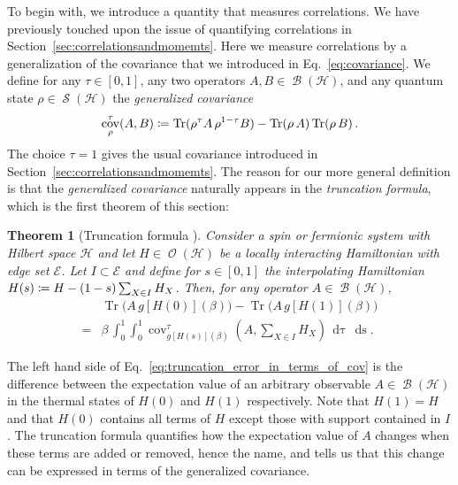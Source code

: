 \documentclass[a4paper,12pt,listof=totoc,index=totoc,bibliography=totoc,headsepline=false,headings=normal,BCOR16.153846mm,DIV12,headinclude,twoside,cleardoublepage=empty,numbers=noenddot,final]{scrreprt}
\theoremstyle{mystyle}
\numberwithin{equation}{section}
\numberwithin{figure}{section}
\numberwithin{lemma}{section}
\newtheorem{theorem}{Theorem}
\numberwithin{theorem}{section}
\numberwithin{corollary}{section}
\numberwithin{definition}{section}
\numberwithin{conjecture}{section}
\numberwithin{observation}{section}
\newcommand{\+}{\mkern2mu}
\newcommand{\coloneqq}{\mathrel{\vcentcolon\mkern-1.2mu=}} %
\newcommand{\texteqref}[1]{Eq.~\eqref{#1}}
\renewcommand{\H}{H}
\newcommand{\rhog}{g}
\newcommand{\Eset}{\mathcal{E}}
\newcommand{\dd}[1]{\mathop{\mathrm{d}#1}}
\DeclareMathOperator{\1}{\mathds{1}}
\DeclareMathOperator{\Bop}{\mathcal{B}}
\DeclareMathOperator{\Obs}{\mathcal{O}}
\DeclareMathOperator{\Qst}{\mathcal{S}}
\DeclareMathOperator{\Tr}{Tr}
\DeclareMathOperator{\cov}{cov}
\newcommand{\mc}[1]{\mathcal{#1}}
\newcommand{\mcH}{\mc{H}}
\begin{document}
To begin with, we introduce a quantity that measures correlations.
We have previously touched upon the issue of quantifying correlations in Section~\ref{sec:correlationsandmomemts}.
Here we measure correlations by a generalization of the covariance that we introduced in \texteqref{eq:covariance}.
We define for any $\tau \in [0,1]$, any two operators $A,B \in \Bop(\mcH)$, and any quantum state $\rho \in \Qst(\mcH)$ the \emph{generalized covariance}
\begin{equation} \label{eq:generalizedcovariance}
 \cov_\rho^\tau(A,B)
 \coloneqq \Tr(\rho^\tau A\, \rho^{1-\tau} B) - \Tr(\rho\, A) \Tr(\rho \, B) \, .
\end{equation}
The choice $\tau = 1$ gives the usual covariance introduced in Section~\ref{sec:correlationsandmomemts}.
The reason for our more general definition is that the \emph{generalized covariance} naturally appears in the \emph{truncation formula}, which is the first theorem of this section:
\begin{theorem}[Truncation formula {\cite[Theorem~1]{Kliesch2013a}}] \label{thm:truncationformula}
  Consider a spin or fermionic system with Hilbert space $\mcH$ and let $\H \in \Obs(\mcH)$ be a locally interacting Hamiltonian with edge set $\Eset$.
  Let $I \subset \Eset$ and define for $s \in [0,1]$ the interpolating Hamiltonian $\H(s) \coloneqq \H - (1-s) \sum_{X \in I} \H_X$.
  Then, for any operator $A \in \Bop(\mcH)$,
  \begin{equation}\label{eq:truncation_error_in_terms_of_cov}
    \begin{split}
      &\Tr\bigl(A\,\rhog[\H(0)](\beta)\bigr)-\Tr\bigl(A\,\rhog[\H(1)](\beta)\bigr) \\
      = &\beta\,\int_0^1  \int_0^1 \cov_{\rhog[\H(s)](\beta)}^\tau(A, \sum_{X \in I} \H_X)\,\dd\tau\,\dd s .
    \end{split}
  \end{equation}
\end{theorem}
The left hand side of \texteqref{eq:truncation_error_in_terms_of_cov} is the difference between the expectation value of an arbitrary observable $A \in \Bop(\mcH)$ in the thermal states of $\H(0)$ and $\H(1)$ respectively.
Note that $\H(1) = \H$ and that $\H(0)$ contains all terms of $\H$ except those with support contained in $I$.
The truncation formula quantifies how the expectation value of $A$ changes when these terms are added or removed, hence the name, and tells us that this change can be expressed in terms of the generalized covariance.
\end{document}
